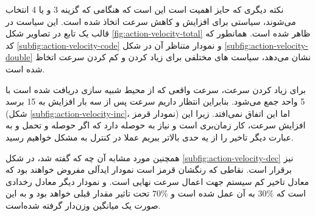 
نکته دیگری که حایز اهمیت است این است که هنگامی که گزینه 3 و یا 4 انتخاب می‌شوند، سیاستی برای افزایش و کاهش سرعت اتخاذ شده است. این سیاست در قالب یک تابع در تصاویر شکل \ref{fig:action-velocity-total} ظاهر شده است. همانطور که کد \ref{subfig:action-velocity-code} و نمودار متناظر آن در شکل \ref{subfig:action-velocity-double} نشان می‌دهد، سیاست های مختلفی برای زیاد کردن و کم کردن سرعت اتخاظ شده است. 

برای زیاد کردن سرعت، سرعت واقعی که از محیط شبیه سازی دریافت شده است با 5 واحد جمع می‌شود. بنابراین انتظار داریم سرعت پس از سه بار افزایش به 15 برسد (شکل \ref{subfig:action-velocity-inc}، نمودار قرمز) اما این اتفاق نمی‌افتد. زیرا این افزایش سرعت، کار زمان‌بری است و 
نیاز به حوصله دارد که اگر حوصله و تحمل و به عبارت دیگر تاخیر را از یه حدی بالاتر ببریم عملا در کنترل  به مشکل خواهیم رسید. 

همچنین مورد مشابه آن چه که گفته شد، در شکل \ref{subfig:action-velocity-dec} نیز برقرار است. نقاطی که رنگشان قرمز است نمودار ایدآلی مفروض خواهند بود که معادل تاخیر کم سیستم جهت اعمال سرعت نهایی است. و نمودار دیگر معادل رخدادی است که $30\%$ به آن عمل شده است و $70\%$ تحت تاثیر مقدار قبلی خواهد بود و به این صورت یک میانگین وزن‌دار گرفته شده‌است.

